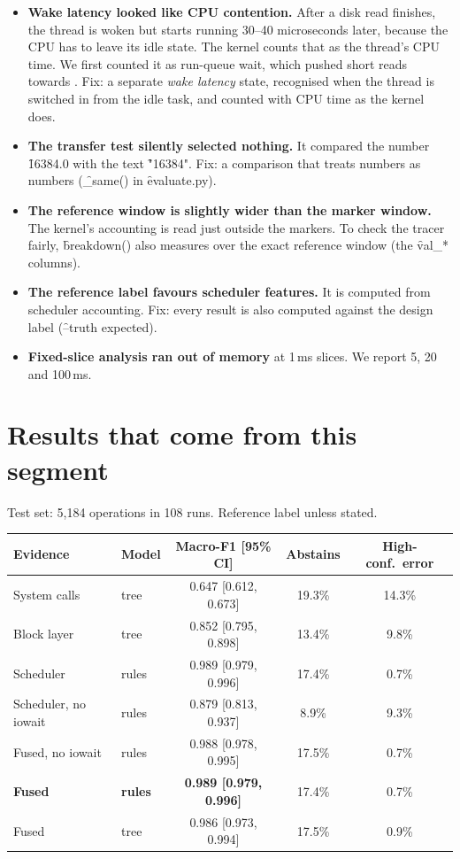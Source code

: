 \documentclass[11pt]{article}
\begin{document}
\begin{itemize}
\item \textbf{Wake latency looked like CPU contention.} After a disk read finishes, the thread is woken but starts running 30--40 microseconds later, because the CPU has to leave its idle state. The kernel counts that as the thread's CPU time. We first counted it as run-queue wait, which pushed short reads towards \SCH. Fix: a separate \emph{wake latency} state, recognised when the thread is switched in from the idle task, and counted with CPU time as the kernel does.
\item \textbf{The transfer test silently selected nothing.} It compared the number \f{16384.0} with the text \f{"16384"}. Fix: a comparison that treats numbers as numbers (\f{\_same()} in \f{evaluate.py}).
\item \textbf{The reference window is slightly wider than the marker window.} The kernel's accounting is read just outside the markers. To check the tracer fairly, \f{breakdown()} also measures over the exact reference window (the \f{val\_*} columns).
\item \textbf{The reference label favours scheduler features.} It is computed from scheduler accounting. Fix: every result is also computed against the design label (\f{--truth expected}).
\item \textbf{Fixed-slice analysis ran out of memory} at 1\,ms slices. We report 5, 20 and 100\,ms.
\end{itemize}

\section{Results that come from this segment}

Test set: 5{,}184 operations in 108 runs. Reference label unless stated.

\begin{center}
\begin{tabular}{@{}llccc@{}}
\toprule
Evidence & Model & Macro-F1 [95\% CI] & Abstains & High-conf.\ error \\
\midrule
System calls & tree & 0.647 [0.612, 0.673] & 19.3\% & 14.3\% \\
Block layer & tree & 0.852 [0.795, 0.898] & 13.4\% & 9.8\% \\
Scheduler & rules & 0.989 [0.979, 0.996] & 17.4\% & 0.7\% \\
Scheduler, no iowait & rules & 0.879 [0.813, 0.937] & 8.9\% & 9.3\% \\
Fused, no iowait & rules & 0.988 [0.978, 0.995] & 17.5\% & 0.7\% \\
\textbf{Fused} & \textbf{rules} & \textbf{0.989 [0.979, 0.996]} & 17.4\% & 0.7\% \\
Fused & tree & 0.986 [0.973, 0.994] & 17.5\% & 0.9\% \\
\bottomrule
\end{tabular}
\end{center}
\end{document}
